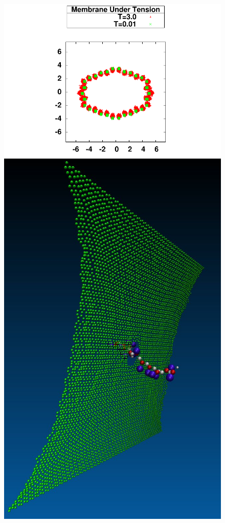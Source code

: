 \begin{figure}[H]
\begin{center}
\begin{minipage}{0.7\linewidth}
\includegraphics[width=1.2\textwidth]{2dhighmembranetension.pdf} 
\end{minipage}
\begin{minipage}{0.29\linewidth}
\includegraphics[width=1.1\textwidth]{membranetendue.jpg}

\end{minipage}
\end{center}
\end{figure}
